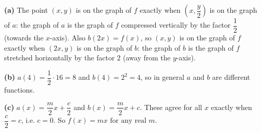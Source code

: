 \textbf{(a)} The point $(x,y)$ is on the graph of $f$ exactly when $\left(x,\dfrac y2\right)$ is on the graph of $a$: the graph of $a$ is the graph of $f$ compressed vertically by the factor $\dfrac12$ (towards the $x$-axis). Also $b(2x)=f(x)$, so $(x,y)$ is on the graph of $f$ exactly when $(2x,y)$ is on the graph of $b$: the graph of $b$ is the graph of $f$ stretched horizontally by the factor $2$ (away from the $y$-axis).

\textbf{(b)} $a(4)=\dfrac12\cdot16=8$ and $b(4)=2^2=4$, so in general $a$ and $b$ are different functions.

\textbf{(c)} $a(x)=\dfrac m2x+\dfrac c2$ and $b(x)=\dfrac m2x+c$. These agree for all $x$ exactly when $\dfrac c2=c$, i.e. $c=0$. So $\boxed{f(x)=mx\text{ for any real }m}$.
